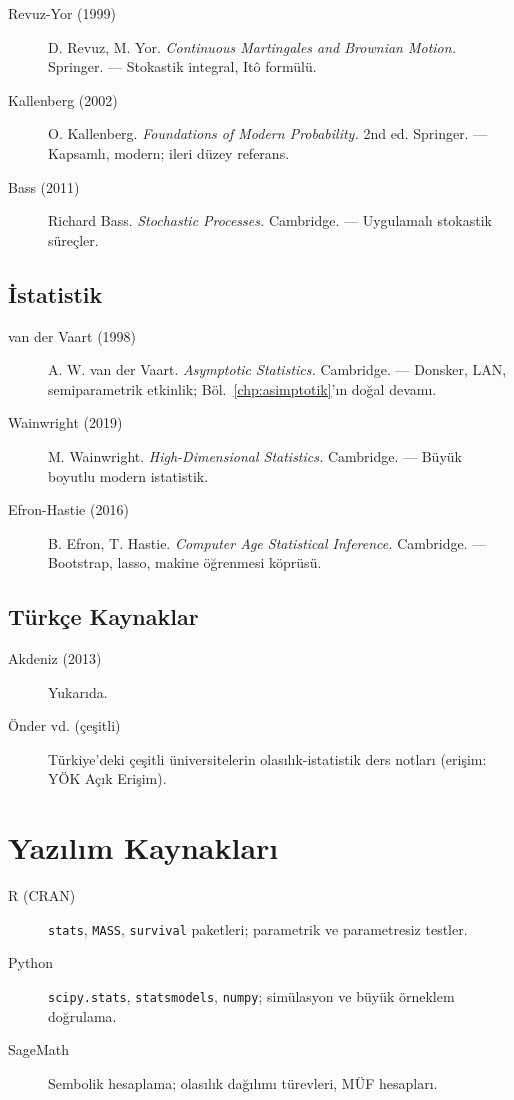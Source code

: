 \begin{description}
  \item[Revuz-Yor (1999)] D. Revuz, M. Yor. \textit{Continuous Martingales and Brownian Motion.} Springer. — Stokastik integral, Itô formülü.
  \item[Kallenberg (2002)] O. Kallenberg. \textit{Foundations of Modern Probability.} 2nd ed. Springer. — Kapsamlı, modern; ileri düzey referans.
  \item[Bass (2011)] Richard Bass. \textit{Stochastic Processes.} Cambridge. — Uygulamalı stokastik süreçler.
\end{description}

\subsection{İstatistik}

\begin{description}
  \item[van der Vaart (1998)] A. W. van der Vaart. \textit{Asymptotic Statistics.} Cambridge. — Donsker, LAN, semiparametrik etkinlik; Böl.~\ref{chp:asimptotik}'ın doğal devamı.
  \item[Wainwright (2019)] M. Wainwright. \textit{High-Dimensional Statistics.} Cambridge. — Büyük boyutlu modern istatistik.
  \item[Efron-Hastie (2016)] B. Efron, T. Hastie. \textit{Computer Age Statistical Inference.} Cambridge. — Bootstrap, lasso, makine öğrenmesi köprüsü.
\end{description}

\subsection{Türkçe Kaynaklar}

\begin{description}
  \item[Akdeniz (2013)] Yukarıda.
  \item[Önder vd. (çeşitli)] Türkiye'deki çeşitli üniversitelerin olasılık-istatistik ders notları (erişim: YÖK Açık Erişim).
\end{description}

\section{Yazılım Kaynakları}

\begin{description}
  \item[R (CRAN)] \texttt{stats}, \texttt{MASS}, \texttt{survival} paketleri; parametrik ve parametresiz testler.
  \item[Python] \texttt{scipy.stats}, \texttt{statsmodels}, \texttt{numpy}; simülasyon ve büyük örneklem doğrulama.
  \item[SageMath] Sembolik hesaplama; olasılık dağılımı türevleri, MÜF hesapları.
\end{description}

